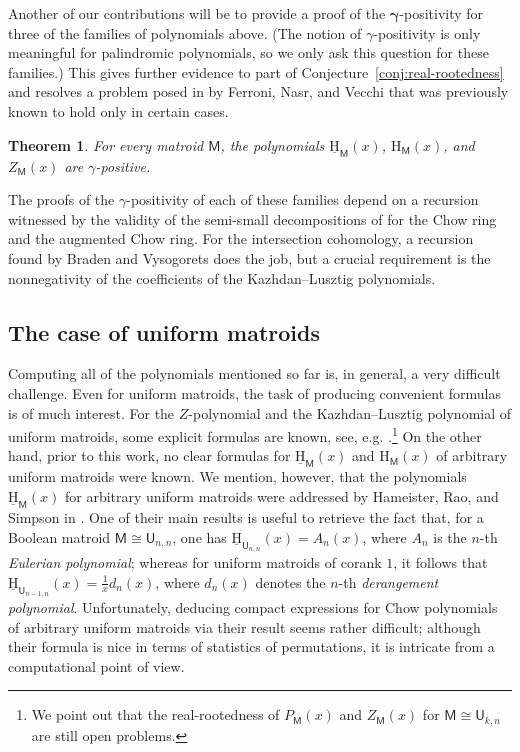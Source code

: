 \documentclass[11pt, a4paper, english]{amsart}
\theoremstyle{teoremas}
\newtheorem{theorem}{Theorem}[section]
\theoremstyle{definition}
\newcommand{\M}{\mathsf{M}}
\newcommand{\U}{\mathsf{U}}
\renewcommand{\H}{\mathrm{H}}
\newcommand{\uH}{\underline{\mathrm{H}}}
\begin{document}
Another of our contributions will be to provide a proof of the $\mathbf{\gamma}$-positivity for three of the families of polynomials above. (The notion of $\gamma$-positivity is only meaningful for palindromic polynomials, so we only ask this question for these families.) This gives further evidence to part of Conjecture~\ref{conj:real-rootedness} and resolves a problem posed in \cite[Conjecture 5.6]{ferroni-nasr-vecchi} by Ferroni, Nasr, and Vecchi that was previously known to hold only in certain cases.

\begin{theorem}\label{thm:main-gamma-positivity}
    For every matroid $\M$, the polynomials $\uH_{\M}(x)$, $\H_{\M}(x)$, and $Z_{\M}(x)$ are $\gamma$-positive.
\end{theorem}

The proofs of the $\gamma$-positivity of each of these families depend on a recursion witnessed by the validity of the semi-small decompositions of \cite{semismall} for the Chow ring and the augmented Chow ring. For the intersection cohomology, a recursion found by Braden and Vysogorets \cite{braden-vysogorets} does the job, but a crucial requirement is the nonnegativity of the coefficients of the Kazhdan--Lusztig polynomials.


\subsection{The case of uniform matroids}\label{subsec:uniform-matroids} Computing all of the polynomials mentioned so far is, in general, a very difficult challenge. Even for uniform matroids, the task of producing convenient formulas is of much interest. For the $Z$-polynomial and the Kazhdan--Lusztig polynomial of uniform matroids, some explicit formulas are known, see, e.g. \cite{gao-uniform}.\footnote{We point out that the real-rootedness of $P_{\M}(x)$ and $Z_{\M}(x)$ for $\M\cong \U_{k,n}$ are still open problems.} On the other hand, prior to this work, no clear formulas for $\uH_\M(x)$ and $\H_\M(x)$ of arbitrary uniform matroids were known. We mention, however, that the polynomials $\uH_{\M}(x)$ for arbitrary uniform matroids were addressed by Hameister, Rao, and Simpson in \cite{hameister-rao-simpson}. One of their main results \cite[Theorem~5.1]{hameister-rao-simpson} is useful to retrieve the fact that, for a Boolean matroid $\M\cong \U_{n,n}$, one has $\uH_{\U_{n,n}}(x)=A_n(x)$, where $A_n$ is the $n$-th \emph{Eulerian polynomial}; whereas for uniform matroids of corank $1$, it follows that  $\uH_{\U_{n-1,n}}(x) = \frac{1}{x}d_n(x)$, where $d_n(x)$ denotes the $n$-th \emph{derangement polynomial}. Unfortunately, deducing compact expressions for Chow polynomials of arbitrary uniform matroids via their result seems rather difficult; although their formula is nice in terms of statistics of permutations, it is intricate from a computational point of view.
\end{document}
